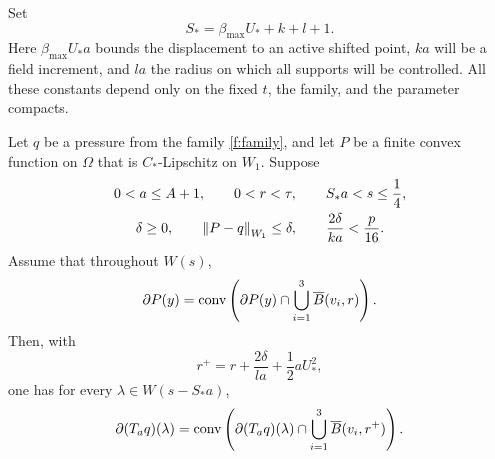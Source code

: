 Set
\[
 S_* = \beta_{\max}U_*+k+l+1.
\]
Here \(\beta_{\max}U_*a\) bounds the displacement to an active
shifted point, \(ka\) will be a field increment, and \(la\) the
radius on which all supports will be controlled.  All these constants
depend only on the fixed \(t\), the family, and the parameter compacts.

\begin{lemma}
\label{m:one-step}
Let \(q\) be a pressure from the family \eqref{f:family}, and let
\(P\) be a finite convex function on \(\Omega\) that is
\(C_*\)-Lipschitz on \(W_1\).  Suppose
\[
 \begin{gathered}
 0<a\le A+1,\qquad 0<r<\tau,\qquad S_*a<s\le\frac14,\\
 \delta\ge0,\qquad \left\lVert P-q\right\rVert_{W_1}\le\delta,\qquad
 \frac{2\delta}{ka}<\frac p{16}.
 \end{gathered}
\]
Assume that throughout \(W(s)\),
\begin{equation}\label{eq:one-step-hypothesis}
 \partial P(y)=\operatorname{conv}\left(\partial P(y)\cap
                 \bigcup_{i=1}^3\overline B(v_i,r)\right).
\end{equation}
Then, with
\[
 r^+=r+\frac{2\delta}{la}+\frac12aU_*^2,
\]
one has for every \(\lambda\in W(s-S_*a)\),
\begin{equation}\label{eq:one-step-conclusion}
 \partial(T_aq)(\lambda)
 =\operatorname{conv}\left(\partial(T_aq)(\lambda)\cap
                 \bigcup_{i=1}^3\overline B(v_i,r^+)\right).
\end{equation}
\end{lemma}

